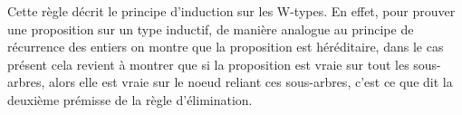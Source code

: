 \documentclass[../../rapport.tex]{subfiles}
\begin{document}
  Cette règle décrit le principe d'induction sur les W-types.
  En effet, pour prouver une proposition sur un type inductif, de manière analogue au principe de récurrence des entiers
  on montre que la proposition est héréditaire, dans le cas présent cela revient à montrer que si la proposition est vraie
  sur tout les sous-arbres, alors elle est vraie sur le noeud reliant ces sous-arbres, c'est ce que dit la deuxième prémisse
  de la règle d'élimination.
\end{document}

